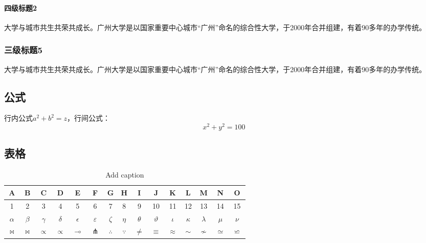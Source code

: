 \paragraph{四级标题2}
大学与城市共生共荣共成长。广州大学是以国家重要中心城市“广州”命名的综合性大学，于2000年合并组建，有着90多年的办学传统。

\subsubsection{三级标题5}
大学与城市共生共荣共成长。广州大学是以国家重要中心城市“广州”命名的综合性大学，于2000年合并组建，有着90多年的办学传统。


\subsection{公式}

行内公式$a^2+b^2=z$，行间公式：
\begin{equation}\label{eq121212}
	x^2+y^2=100
\end{equation}


\subsection{表格}

\begin{table}[htbp]
	\centering
	\caption{Add caption}	\label{tab:1}%
	\begin{tabular}{|c|c|c|c|c|c|c|c|c|c|c|c|c|c|c|}
		\hline
		A           & B           & C           & D           & E           & F           & G           & H           & I           & J           & K           & L           & M           & N           & O \bigstrut\\
		\hline
		1           & 2           & 3           & 4           & 5           & 6           & 7           & 8           & 9           & 10          & 11          & 12          & 13          & 14          & 15 \bigstrut\\
		\hline
		$\alpha$        & $\beta$        & $\gamma$        & $\delta$        & $\epsilon$        & $\varepsilon$        & $\zeta$        & $\eta$        & $\theta$        & $\vartheta$        & $\iota$        & $\kappa$        & $\lambda$        & $\mu$        & $\nu$ \bigstrut\\
		\hline
		$\bowtie$        & $\Join$        & $\propto$        & $\varpropto$        & $\multimap$        & $\pitchfork$        & $\therefore$        & $\because$        & $\neq$        & $\equiv$        & $\approx$        & $\sim$        & $\nsim$        & $\simeq$        & $\backsimeq$ \bigstrut\\
		\hline
	\end{tabular}
\end{table}



